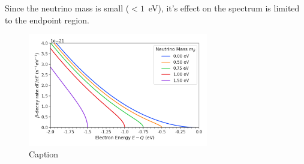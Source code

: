 Since the neutrino mass is small ($<1$~eV), it's effect on the spectrum is limited to the endpoint region.

\begin{figure}[htbp]
    \centering
    \includegraphics[width=0.7\textwidth]{figs/Chapter-2/230302_atomic_tritium_spectrum_near_endpoint.png}
    \caption{Caption}
    \label{fig:atomic_tritium_endpoint}
\end{figure}
